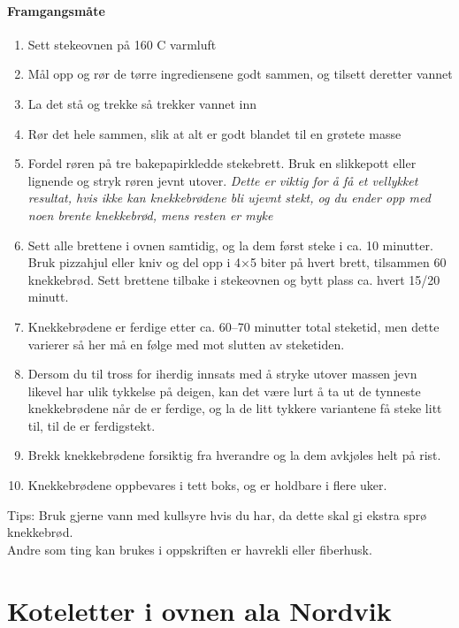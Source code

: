 \documentclass[12pt,a4paper]{book}
\begin{document}
\paragraph{Framgangsmåte}
\begin{enumerate}[noitemsep]
	\item Sett stekeovnen på 160 \degree C varmluft
	\item Mål opp og rør de tørre ingrediensene godt sammen, og tilsett deretter vannet
	\item La det stå og trekke så trekker vannet inn
	\item Rør det hele sammen, slik at alt er godt blandet til en grøtete masse
	\item Fordel røren på tre bakepapirkledde stekebrett. Bruk en slikkepott eller lignende og stryk røren jevnt utover. \emph{Dette er viktig for å få et vellykket resultat, hvis ikke kan knekkebrødene bli ujevnt stekt, og du ender opp med noen brente knekkebrød, mens resten er myke}
	\item Sett alle brettene i ovnen samtidig, og la dem først steke i ca. 10 minutter. Bruk pizzahjul eller kniv og del opp i 4×5 biter på hvert brett, tilsammen 60 knekkebrød. Sett brettene tilbake i stekeovnen og bytt plass ca. hvert 15/20 minutt.
	\item Knekkebrødene er ferdige etter ca. 60--70 minutter total steketid, men dette varierer så her må en følge med mot slutten av steketiden.
	\item Dersom du til tross for iherdig innsats med å stryke utover massen jevn likevel har ulik tykkelse på deigen, kan det være lurt å ta ut de tynneste knekkebrødene når de er ferdige, og la de litt tykkere variantene få steke litt til, til de er ferdigstekt.
	\item Brekk knekkebrødene forsiktig fra hverandre og la dem avkjøles helt på rist.
	\item Knekkebrødene oppbevares i tett boks, og er holdbare i flere uker.
\end{enumerate}



Tips: Bruk gjerne vann med kullsyre hvis du har, da dette skal gi ekstra sprø knekkebrød. \\ Andre som ting kan brukes i oppskriften er havrekli eller fiberhusk.
\clearpage{}
\clearpage{}\section{﻿Koteletter i ovnen ala Nordvik}
\end{document}
